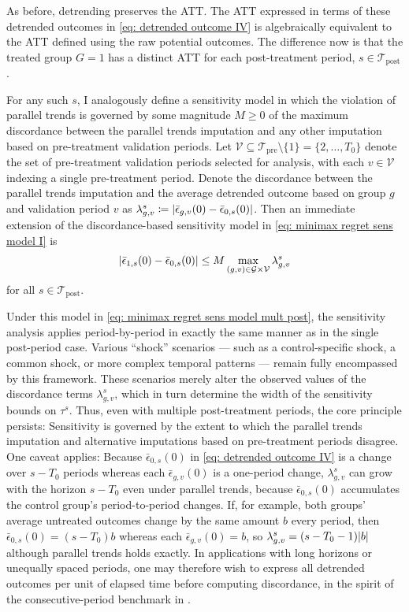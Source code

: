 \documentclass[twoside,11pt]{article}
\begin{document}
As before, detrending preserves the \textrm{ATT}. The \textrm{ATT} expressed in
terms of these detrended outcomes in \eqref{eq: detrended outcome IV} is algebraically equivalent to the \textrm{ATT} defined using the raw potential outcomes. The difference now is that the treated group $G = 1$ has a distinct \textrm{ATT} for each post-treatment period, $s \in \mathcal{T}_{\mathrm{post}}$.

For any such $s$, I analogously define a sensitivity model in which the
violation of parallel trends is governed by some magnitude $M \geq 0$ of the
maximum discordance between the parallel trends imputation and any other
imputation based on pre-treatment validation periods. Let
$\mathcal{V} \subseteq \mathcal{T}_{\mathrm{pre}} \setminus \{1\} = \{2, \ldots, T_0\}$ denote the set of
pre-treatment validation periods selected for analysis, with each
$v \in \mathcal{V}$ indexing a single pre-treatment period. Denote the
discordance between the parallel trends imputation and the average detrended
outcome based on group $g$ and validation period $v$ as $\lambda^{s}_{g,v} \coloneqq \lvert\bar{\epsilon}_{g,v}(0) - \bar{\epsilon}_{0,s}(0)\rvert$. Then an immediate extension of the discordance-based sensitivity model in \eqref{eq: minimax regret sens model I} is
\begin{align}
\label{eq: minimax regret sens model mult post}
\lvert\bar{\epsilon}_{1,s}(0) - \bar{\epsilon}_{0,s}(0)\rvert \leq M \max_{(g,v) \in \mathcal{G} \times \mathcal{V}} \lambda^{s}_{g,v}
\end{align}
for all $s \in \mathcal{T}_{\mathrm{post}}$.

Under this model in \eqref{eq: minimax regret sens model mult post}, the sensitivity analysis applies period-by-period in exactly the same manner as in the single post-period case. Various ``shock'' scenarios --- such as a control-specific shock, a common shock, or more complex temporal patterns --- remain fully encompassed by this framework. These scenarios merely alter the observed values of the discordance terms $\lambda^{s}_{g,v}$, which in turn determine the width of the sensitivity bounds on $\tau^s$. Thus, even with multiple post-treatment periods, the core principle persists: Sensitivity is governed by the extent to which the parallel trends imputation and alternative imputations based on pre-treatment periods disagree. One caveat applies: Because $\bar{\epsilon}_{0,s}(0)$ in \eqref{eq: detrended outcome IV} is a change over $s - T_0$ periods whereas each $\bar{\epsilon}_{g,v}(0)$ is a one-period change, $\lambda^{s}_{g,v}$ can grow with the horizon $s - T_0$ even under parallel trends, because $\bar{\epsilon}_{0,s}(0)$ accumulates the control group's period-to-period changes. If, for example, both groups' average untreated outcomes change by the same amount $b$ every period, then $\bar{\epsilon}_{0,s}(0) = (s - T_0) b$ whereas each $\bar{\epsilon}_{g,v}(0) = b$, so $\lambda^{s}_{g,v} = (s - T_0 - 1) \lvert b\rvert$ although parallel trends holds exactly. In applications with long horizons or unequally spaced periods, one may therefore wish to express all detrended outcomes per unit of elapsed time before computing discordance, in the spirit of the consecutive-period benchmark in \citet[][fn.~7]{rambachanroth2023}.
\end{document}
